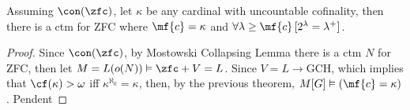 \begin{corollary}{}{}
    Assuming $\con(\zfc)$, let $\kappa$ be any cardinal with uncountable cofinality, then there is a ctm for ZFC where $\mf{c}=\kappa$ and $\forall\lambda\geq\mf{c}\,[2^\lambda=\lambda^+]$.
\end{corollary}

\begin{proof}
    Since $\con(\zfc)$, by Mostowski Collapsing Lemma there is a ctm $N$ for ZFC, then let $M=L(o(N))\vDash\zfc+V=L$. Since $V=L\to\text{GCH}$, which implies that $\cf(\kappa)>\omega$ iff $\kappa^{\aleph_0}=\kappa$, then, by the previous theorem, $M[G]\vDash(\mf{c}=\kappa)$. \textcolor{laser_eyes}{Pendent}
\end{proof}

